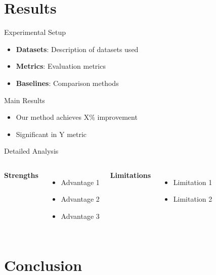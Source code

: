 \documentclass[aspectratio=169]{beamer}
\begin{document}
\section{Results}

\begin{frame}{Experimental Setup}
\begin{itemize}
    \item \textbf{Datasets}: Description of datasets used
    \item \textbf{Metrics}: Evaluation metrics
    \item \textbf{Baselines}: Comparison methods
\end{itemize}
\end{frame}

\begin{frame}{Main Results}
\begin{center}
\end{center}

\begin{itemize}
    \item Our method achieves X\% improvement
    \item Significant in Y metric
\end{itemize}
\end{frame}

\begin{frame}{Detailed Analysis}
\begin{columns}
\textbf{Strengths}
\begin{itemize}
    \item[+] Advantage 1
    \item[+] Advantage 2
    \item[+] Advantage 3
\end{itemize}

\textbf{Limitations}
\begin{itemize}
    \item[-] Limitation 1
    \item[-] Limitation 2
\end{itemize}
\end{columns}
\end{frame}

\section{Conclusion}
\end{document}

